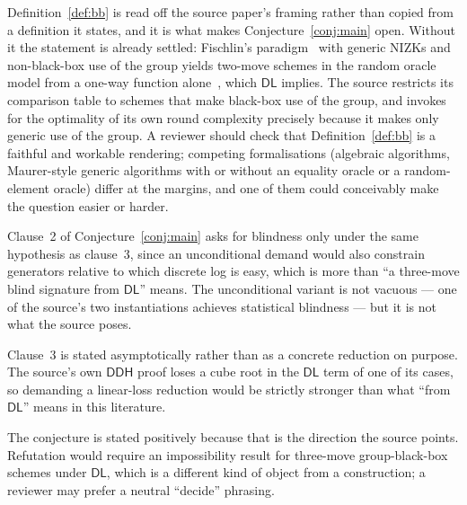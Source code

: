 \documentclass{conjura-conjecture}
\newcommand{\DL}{\mathsf{DL}}
\newcommand{\DDH}{\mathsf{DDH}}
\begin{document}
\begin{remark}\label{rem:bb}
Definition~\ref{def:bb} is read off the source paper's framing rather than
copied from a definition it states, and it is what makes
Conjecture~\ref{conj:main} open. Without it the statement is already
settled: Fischlin's paradigm~\cite{Fis06} with generic NIZKs and
non-black-box use of the group yields two-move schemes in the random
oracle model from a one-way function alone~\cite{CMV26}, which $\DL$
implies. The source restricts its comparison table to schemes that make
black-box use of the group, and invokes~\cite{DKT26} for the optimality of
its own round complexity precisely because it makes only generic use of
the group. A reviewer should check that Definition~\ref{def:bb} is a
faithful and workable rendering; competing formalisations (algebraic
algorithms, Maurer-style generic algorithms with or without an equality
oracle or a random-element oracle) differ at the margins, and one of them
could conceivably make the question easier or harder.
\end{remark}

\begin{remark}[blindness is conditioned on $\DL$]\label{rem:blind}
Clause~2 of Conjecture~\ref{conj:main} asks for blindness only under the
same hypothesis as clause~3, since an unconditional demand would also
constrain generators relative to which discrete log is easy, which is more
than ``a three-move blind signature from $\DL$'' means. The unconditional
variant is not vacuous --- one of the source's two instantiations achieves
statistical blindness --- but it is not what the source poses.
\end{remark}

\begin{remark}\label{rem:asympt}
Clause~3 is stated asymptotically rather than as a concrete reduction on
purpose. The source's own $\DDH$ proof loses a cube root in the $\DL$ term
of one of its cases, so demanding a linear-loss reduction would be
strictly stronger than what ``from $\DL$'' means in this literature.
\end{remark}

\begin{remark}\label{rem:direction}
The conjecture is stated positively because that is the direction the
source points. Refutation would require an impossibility result for
three-move group-black-box schemes under $\DL$, which is a different kind
of object from a construction; a reviewer may prefer a neutral ``decide''
phrasing.
\end{remark}
\end{document}
